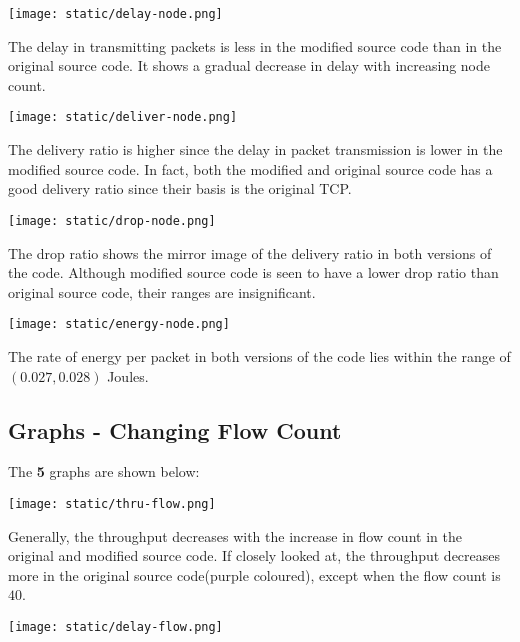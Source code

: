 \documentclass{article}
\begin{document}
\begin{center}
    \texttt{[image: static/delay-node.png]}
\end{center}

The delay in transmitting packets is less in the modified source code than in the original source code. It shows a gradual decrease in delay with increasing node count.

\begin{center}
    \texttt{[image: static/deliver-node.png]}
\end{center}

The delivery ratio is higher since the delay in packet transmission is lower in the modified source code. In fact, both the modified and original source code has a good delivery ratio since their basis is the original TCP.

\begin{center}
    \texttt{[image: static/drop-node.png]}
\end{center}

The drop ratio shows the mirror image of the delivery ratio in both versions of the code. Although modified source code is seen to have a lower drop ratio than original source code, their ranges are insignificant.

\begin{center}
    \texttt{[image: static/energy-node.png]}
\end{center}

The rate of energy per packet in both versions of the code lies within the range of $(0.027, 0.028)$ Joules.

\subsection{Graphs - Changing Flow Count}
The \textbf{5} graphs are shown below:

\begin{center}
    \texttt{[image: static/thru-flow.png]}
\end{center}

Generally, the throughput decreases with the increase in flow count in the original and modified source code. If closely looked at, the throughput decreases more in the original source code(purple coloured), except when the flow count is $40$.

\begin{center}
    \texttt{[image: static/delay-flow.png]}
\end{center}
\end{document}
